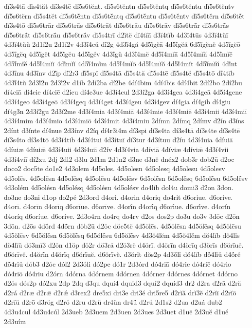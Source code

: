 {dĭ3s4tā
dĭs4tăt
dĭ3s4tē
dĭ5s6tĕnt.
dĭ5s6tĕntn
dĭ5s6tĕntq
dĭ5s6tĕntu
dĭ5s6tĕntv
dĭ5s6tĕrn
dĭ5s4tĕt
dĭ5s6tĕ́ntn
dĭ5s6tĕ́ntq
dĭ5s6tĕ́ntu
dĭ5s6tĕ́ntv
dĭ5s6tĕ́rn
dĭ5s6tĕ́t
dĭ3s4tō
dĭ5s6trār
dĭ5s6trās
dĭ5s6trāt
dĭ5s6trāu
dĭ5s6trāv
dĭ5s6trā́r
dĭ5s6trā́s
dĭ5s6trā́t
dĭ5s6trā́u
dĭ5s6trā́v
dĭ5s4trī
d2ĭtĕ
dĭ4tĭā
d3ĭ4tĭb
4d3ĭ4tūs
4d3ĭ4tŭī
4d3ĭ4tŭŭ
2d1ĭ2u
2d1ĭ2v
4d3ĭ́4cŭ
dĭ́2g
4d3ĭ́4gă
4d5ĭ́gĕā
4d5ĭ́gĕă
6d5ĭ́gĕnĕ
4d5ĭ́gĕō
4d5ĭ́gĕq
4d5ĭ́gĕt
4d5ĭ́gĕu
4d5ĭ́gĕv
4d3ĭ́gŭ
4d3ĭ́4mĕ
4d5ĭ́4mĭā
4d5ĭ́4mĭă
4d5ĭ́mĭē
4d5ĭ́mĭĕ
4d5ĭ́4mĭī
4dĭ́mĭĭ
4d5ĭ́4mĭm
4d5ĭ́4mĭō
4d5ĭ́4mĭŏ
4d5ĭ́4mĭt
4d5ĭ́mĭŭ
4dĭ́nt
4d3ĭ́nu
4d3ĭ́nv
d2ĭ́p
dĭ́2r3
dĭ́5spĭ
dĭ́5s4tā
dĭ́5s4tă
dĭ́5s4tē
dĭ́5s4tĕ
dĭ́5s4tō
dĭ́4tĭb
4d3ĭ́4tŭ
2d3ĭ́2u
2d3ĭ́2v
d1íb
2dí2ba
dí2be
4dí4bim
4dí4bis
4dí4bit
2dí2bo
2dí2bu
dí4ciā
dí4cie
dí4ciē
d2ícu
dí4c3ue
4d3í4cul
2d3í2ga
4d3í4gea
4d3í4geā
4d5í4gene
4d3í4geo
4d3í4geō
4d3í4geq
4d3í4get
4d3í4geu
4d3í4gev
dí4gia
dí4gib
dí4giu
dí4g3n
2d3í2gu
2d3í2me
4d3í4mia
4d3í4miā
4d3í4mie
4d3í4miē
4d3í4mii
4d3í4miī
4d3í4mim
4d3í4mio
4d3í4miō
4d3í4mit
4d3í4miu
2dímn
2dímq
2dímv
d2ín
d3íns
2dínt
d3ínte
dí4nue
2d3ínv
d2íq
dí4r3i4m
dí3spi
dí3s4ta
dí3s4tā
dí3s4te
dí3s4tē
dí3s4to
dí3s4tō
4d3í4tib
4d3í4tui
4d3ítuī
dí3tur
4d3ítuu
d2íu
4d3í4uia
4díuiā
4díuiæ
4díuiǣ
4d3í4uii
4d3í4uiī
d2ív
4d3í4via
4díviā
4díviæ
4díviǣ
4d3í4vii
4d3í4viī
dí2xu
2dj
2dl2
d3lu
2d1m
2d1n2
d3ne
d3nĕ
dnéx2
dob3r
dob2ū
d2oc
doco2
doc5te
do1e2
4d3olem
4d5oles.
4d5olesn
4d5olesq
4d5olesu
4d5olesv
4d5olēs.
4d5olēsn
4d5olēsq
4d5olēsu
4d5olēsv
6d5olḗsn
6d5olḗsq
6d5olḗsu
6d5olḗsv
4d3olém
4d5olésn
4d5olésq
4d5olésu
4d5olésv
do4lib
dol4u
domi3
d2on
3don.
do3ne
do3ni
d1op
do2pé
2d3ord
d4ori.
d4orin
d4oriq
do4rit
d6oriue.
d6orive.
d4orī.
d4orīn
d4orīq
d6orīue.
d6orīve.
d4orī́n
d4orī́q
d6orī́ue.
d6orī́ve.
d4orín
d4oríq
d6oríue.
d6oríve.
2d3o4rn
do4rq
do4rv
d2os
dos2p
do3u
do3v
3dōc
d2ōn
3dōn.
d2ōs
4dṓrd
4dṓrn
dŏb2ū
d2ŏc
dŏc5tĕ
4d5ŏlēs.
4d5ŏlēsn
4d5ŏlēsq
4d5ŏlēsu
4d5ŏlēsv
6d5ŏlḗsn
6d5ŏlḗsq
6d5ŏlḗsu
6d5ŏlḗsv
4d3ŏ4lĕm
4d5ŏ4lĕ́m
dŏ4lĭb
dŏ4lĭs
dŏ4lĭŭ
dŏ3mĭ3
d2ŏn
d1ŏp
dŏ2r
dŏ3ră
d2ŏ3rĕ
d4ŏrī.
d4ŏrīn
d4ŏrīq
d3ŏrīs
d6ŏrīuĕ.
d6ŏrīvĕ.
d4ŏrī́n
d4ŏrī́q
d6ŏrī́uĕ.
d6ŏrī́vĕ.
d3ŏrĭt
dŏs2p
4d3ŏ́lĭ
dŏ́4lĭb
dŏ́4lĭŭ
d4ŏ́rĕ
dŏ́4rĭŭ
dób3
d2óc
dól2
2d3óli
dó2pe
dó1r
2d3órd
dó4riā
dó4rie
dó4riē
dó4rio
dó4riō
dó4riu
d2órn
4dórna
4dórnem
4dórnen
4dórner
4dórnes
4dórnet
4dórno
d2ós
dós2p
dó2xu
2dp
2dq
d3qu
dqui4
dquid3
dquí2
dquíd3
dr2
d2ra
d2rā
d2ră
d2rá
d2ræ
d2rǣ
d2rǽ
d3rex2
dre5xi
dri3e
dri3é
dri5re5
d2rĭă
drĭ3ĕ
d2rĭī
d2rĭō
d2rĭŭ
d2rō
d3rŏg
d2ró
d2ru
d2rŭ
dr4ŭn
dr4ŭ́
d2rú
2d1s2
d2ua
d2uá
dub2
4d3u4cul
4d3u4cúl
2d3ueb
2d3uem
2d3uen
2d3ues
2d3uet
d1uē
2d3uĕ
d1ué
2d3uím
}
